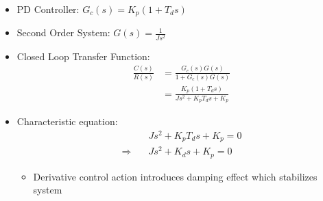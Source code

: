 \documentclass[a4paper]{article}
\begin{document}
\begin{center}
\end{center}

\begin{itemize}
    \item PD Controller: $G_c(s) = K_p(1+T_ds)$
    \item Second Order System: $G(s) = \frac{1}{Js^2}$
    \item Closed Loop Transfer Function:
    \begin{align*}
        \frac{C(s)}{R(s)} &= \frac{G_c(s)G(s)}{1+G_c(s)G(s)}\\
        &= \frac{K_p(1+T_ds)}{Js^2+K_pT_ds+K_p}
    \end{align*}
    \item Characteristic equation: 
    \begin{align*}
        &Js^2+K_pT_ds+K_p = 0\\
        \Rightarrow\quad &Js^2+K_ds+K_p = 0
    \end{align*}
    \begin{itemize}[label=$\circ$]
        \item Derivative control action introduces damping effect which stabilizes system
    \end{itemize}
\end{itemize}
\end{document}
